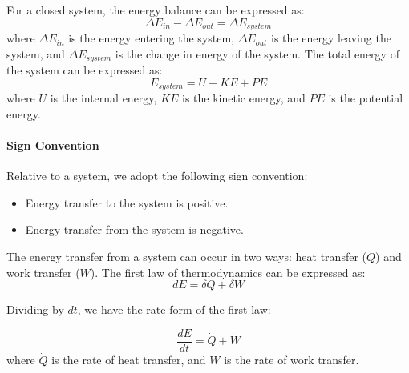 \documentclass[11pt]{report}
\begin{document}
\begin{definition}
    For a closed system, the energy balance can be expressed as:
    \begin{equation}
        \Delta E_{in} - \Delta E_{out} = \Delta E_{system}
    \end{equation}
    where $\Delta E_{in}$ is the energy entering the system, $\Delta E_{out}$ is the energy leaving the system, and $\Delta E_{system}$ is the change in energy of the system. The total energy of the system can be expressed as:
    \begin{equation}
        E_{system} = U + KE + PE
    \end{equation}
    where $U$ is the internal energy, $KE$ is the kinetic energy, and $PE$ is the potential energy.
\end{definition}

\paragraph{Sign Convention} Relative to a system, we adopt the following sign convention:
\begin{itemize}
    \item Energy transfer to the system is positive.
    \item Energy transfer from the system is negative.
\end{itemize}

\begin{definition}
    The energy transfer from a system can occur in two ways: heat transfer ($Q$) and work transfer ($W$). The first law of thermodynamics can be expressed as:
    \begin{equation}
        dE = \delta Q + \delta W
    \end{equation}
\end{definition}

Dividing by $dt$, we have the rate form of the first law:
\begin{definition}
    \begin{equation}
        \frac{dE}{dt} = \dot{Q} + \dot{W}
    \end{equation}
    where $\dot{Q}$ is the rate of heat transfer, and $\dot{W}$ is the rate of work transfer.
\end{definition}

\end{document}
